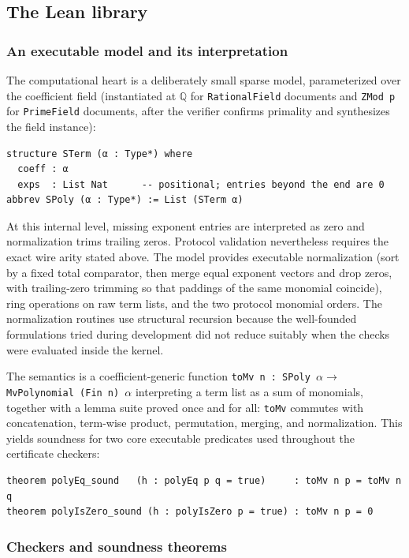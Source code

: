\documentclass[11pt]{article}
\newcommand{\QQ}{\mathbb{Q}}
\newcommand{\code}[1]{\texttt{#1}}
\begin{document}
\subsection{The Lean library}\label{sec:lean}

\subsubsection{An executable model and its interpretation}

The computational heart is a deliberately small sparse model,
parameterized over the coefficient field (instantiated at $\QQ$ for
\code{RationalField} documents and \code{ZMod p} for
\code{PrimeField} documents, after the verifier confirms primality
and synthesizes the field instance):
\begin{lstlisting}[style=leanstyle]
structure STerm (α : Type*) where
  coeff : α
  exps  : List Nat      -- positional; entries beyond the end are 0
abbrev SPoly (α : Type*) := List (STerm α)
\end{lstlisting}
At this internal level, missing exponent entries are interpreted as
zero and normalization trims trailing zeros.  Protocol validation
nevertheless requires the exact wire arity stated above.
The model provides executable normalization (sort by a fixed total comparator, then
merge equal exponent vectors and drop zeros, with trailing-zero
trimming so that paddings of the same monomial coincide), ring
operations on raw term lists, and the two protocol monomial orders.
The normalization routines use structural recursion because the
well-founded formulations tried during development did not reduce
suitably when the checks were evaluated inside the kernel.

The semantics is a coefficient-generic function
\code{toMv n : SPoly $\alpha\to$ MvPolynomial (Fin n) $\alpha$}
interpreting a term list as a sum of monomials, together with a
lemma suite proved once and for all: \code{toMv} commutes with
concatenation, term-wise product, permutation, merging, and
normalization.  This yields soundness for two core executable
predicates used throughout the certificate checkers:
\begin{lstlisting}[style=leanstyle]
theorem polyEq_sound   (h : polyEq p q = true)     : toMv n p = toMv n q
theorem polyIsZero_sound (h : polyIsZero p = true) : toMv n p = 0
\end{lstlisting}

\subsubsection{Checkers and soundness theorems}
\end{document}
